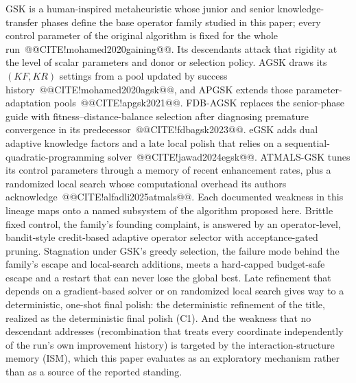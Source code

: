 \documentclass[10pt,a4paper]{article}
\newcommand{\atmals}{ATMALS-GSK}
\newcommand{\agsk}{AGSK}
\newcommand{\apgsk}{APGSK}
\newcommand{\fdbagsk}{FDB-AGSK}
\newcommand{\egsk}{eGSK}
\begin{document}
GSK is a human-inspired metaheuristic whose junior and senior
knowledge-transfer phases define the base operator family studied in
this paper; every control parameter of the original algorithm is fixed
for the whole run~@@CITE!mohamed2020gaining@@. 
Its descendants attack that rigidity at the level of scalar parameters and
donor or selection policy. \agsk{} draws its $(KF, KR)$ settings from a
pool updated by success history~@@CITE!mohamed2020agsk@@, and \apgsk{}
extends those parameter-adaptation pools~@@CITE!apgsk2021@@. \fdbagsk{}
replaces the senior-phase guide with fitness--distance-balance selection
after diagnosing premature convergence in its
predecessor~@@CITE!fdbagsk2023@@. \egsk{} adds dual adaptive knowledge
factors and a late local polish that relies on a
sequential-quadratic-programming solver~@@CITE!jawad2024egsk@@. \atmals{}
tunes its control parameters through a memory of recent enhancement rates,
plus a randomized local search whose computational overhead its authors
acknowledge~@@CITE!alfadli2025atmals@@. 
Each documented weakness in this lineage maps onto a named subsystem of
the algorithm proposed here. Brittle fixed control, the family's
founding complaint, is answered by an operator-level, bandit-style
credit-based adaptive operator selector
with acceptance-gated pruning. Stagnation under GSK's greedy
selection, the failure mode behind the family's escape and local-search
additions, meets a hard-capped budget-safe escape and a restart
that can never lose the global best. Late refinement that depends on a
gradient-based solver or on randomized local search gives way to a
deterministic, one-shot final polish: the deterministic refinement of
the title, realized as the deterministic final polish (C1). And the weakness that no
descendant addresses (recombination that treats every coordinate
independently of the run's own improvement history) is targeted by the
interaction-structure memory (ISM), which this paper evaluates as an
exploratory mechanism rather than as a source of the reported standing.
\end{document}
